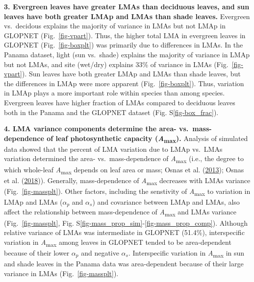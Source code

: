 \documentclass[
  12pt,
  a4paper,
,tablecaptionabove
]{scrartcl}
\begin{document}
\textbf{3. Evergreen leaves have greater LMAs than deciduous leaves, and
sun leaves have both greater LMAp and LMAs than shade leaves.} Evergreen
vs.~decidous explains the majority of variance in LMAs but not LMAp in
GLOPNET (Fig.~\ref{fig-vpart}). Thus, the higher total LMA in evergreen
leaves in GLOPNET (Fig.~\ref{fig-boxplt}) was primarily due to
differences in LMAs. In the Panama dataset, light (sun vs.~shade)
explains the majority of variance in LMAp but not LMAs, and site
(wet/dry) explains 33\% of variance in LMAs (Fig.~\ref{fig-vpart}). Sun
leaves have both greater LMAp and LMAs than shade leaves, but the
differences in LMAp were more apparent (Fig.~\ref{fig-boxplt}). Thus,
variation in LMAp plays a more important role within species than among
species. Evergreen leaves have higher fraction of LMAs compared to
deciduous leaves both in the Panama and the GLOPNET dataset (Fig.
S\ref{fig-box_frac}).

\textbf{4. LMA variance components determine the area-
vs.~mass-dependence of leaf photosynthetic capacity
(\emph{A}\textsubscript{max}).} Analysis of simulated data showed that
the percent of LMA variation due to LMAp vs.~LMAs variation determined
the area- vs.~mass-dependence of \emph{A}\textsubscript{max} (i.e., the
degree to which whole-leaf \emph{A}\textsubscript{max} depends on leaf
area or mass; Osnas et al. (\protect\hyperlink{ref-Osnas2013}{2013});
Osnas et al. (\protect\hyperlink{ref-Osnas2018}{2018})). Generally,
mass-dependence of \emph{A}\textsubscript{max} decreases with LMAs
variance (Fig.~\ref{fig-massplt}). Other factors, including the
senstivity of \emph{A}\textsubscript{max} to variation in LMAp and LMAs
(\(\alpha_p\) and \(\alpha_s\)) and covariance between LMAp and LMAs,
also affect the relationship between mass-dependence of
\emph{A}\textsubscript{max} and LMAs variance (Fig.~\ref{fig-massplt},
Fig. S\ref{fig-mass_prop_sim}-\ref{fig-mass_prop_comp}). Although
relative variance of LMAs was intermediate in GLOPNET (51.4\%),
interspecific variation in \emph{A}\textsubscript{max} among leaves in
GLOPNET tended to be area-dependent because of their lower \(\alpha_p\)
and negative \(\alpha_s\). Interspecific variation in
\emph{A}\textsubscript{max} in sun and shade leaves in the Panama data
was area-dependent because of their large variance in LMAs
(Fig.~\ref{fig-massplt}).
\end{document}
